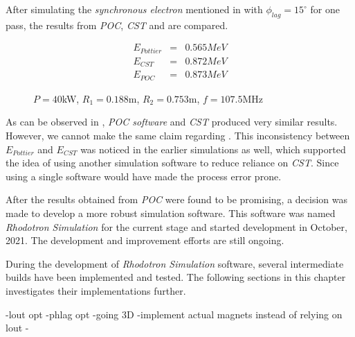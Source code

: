 \documentclass{article}
\begin{document}
After simulating the \textit{synchronous electron} mentioned in  with $\phi_{lag}=15^\circ$ for one pass, the results from \textit{POC}, \textit{CST} and  are compared.
\begin{figure}[H]
    \begin{eqnarray}
        E_{Pottier} &=& 0.565 MeV \nonumber\\
        E_{CST} &=& 0.872 MeV  \label{eq:poc_E_results}\\
        E_{POC} &=& 0.873 MeV \nonumber
    \end{eqnarray}
    \caption*{$P=40$kW, $R_1=0.188$m, $R_2=0.753$m, $f=107.5$MHz}
\end{figure}
As can be observed in , \textit{POC software} and \textit{CST} produced very similar results. However, we cannot make the same claim regarding .
This inconsistency between $E_{Pottier}$ and $E_{CST}$ was noticed in the earlier simulations as well, which supported the idea of using another simulation software to reduce reliance on \textit{CST}.
Since using a single software would have made the process error prone.

After the results obtained from \textit{POC} were found to be promising, a decision was made to develop a more robust simulation software. This software was named \textit{Rhodotron Simulation} for the current stage and started development in October, 2021.
The development and improvement efforts are still ongoing. 

During the development of \textit{Rhodotron Simulation} software, several intermediate builds have been implemented and tested. The following sections in this chapter investigates their implementations further.



-lout opt
-phlag opt
-going 3D
-implement actual magnets instead of relying on lout
-
\end{document}
